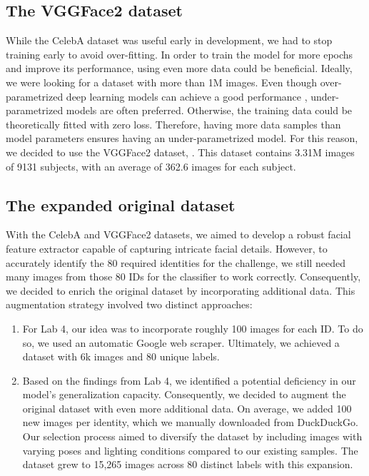 \documentclass[11pt, a4paper]{article}
\numberwithin{equation}{subsection}
\begin{document}
\subsection{The VGGFace2 dataset}

While the CelebA dataset was useful early in development, we had to stop training early to avoid over-fitting. In order to train the model for more epochs and improve its performance, using even more data could be beneficial. Ideally, we were looking for a dataset with more than 1M images. Even though over-parametrized deep learning models can achieve a good performance \cite{geiger2020scaling}, under-parametrized models are often preferred. Otherwise, the training data could be theoretically fitted with zero loss. Therefore, having more data samples than model parameters ensures having an under-parametrized model. For this reason, we decided to use the VGGFace2 dataset, \cite{cao2018vggface2}. This dataset contains 3.31M images of 9131 subjects, with an average of 362.6 images for each subject.

\subsection{The expanded original dataset}


With the CelebA and VGGFace2 datasets, we aimed to develop a robust facial feature extractor capable of capturing intricate facial details. However, to accurately identify the 80 required identities for the challenge, we still needed many images from those 80 IDs for the classifier to work correctly. Consequently, we decided to enrich the original dataset by incorporating additional data. This augmentation strategy involved two distinct approaches:

\begin{enumerate}
    \item For Lab 4, our idea was to incorporate roughly 100 images for each ID. To do so, we used an automatic Google web scraper. Ultimately, we achieved a dataset with 6k images and 80 unique labels.
    \item Based on the findings from Lab 4, we identified a potential deficiency in our model's generalization capacity. Consequently, we decided to augment the original dataset with even more additional data. On average, we added 100 new images per identity, which we manually downloaded from DuckDuckGo. Our selection process aimed to diversify the dataset by including images with varying poses and lighting conditions compared to our existing samples. The dataset grew to 15,265 images across 80 distinct labels with this expansion.    
\end{enumerate}
\end{document}
